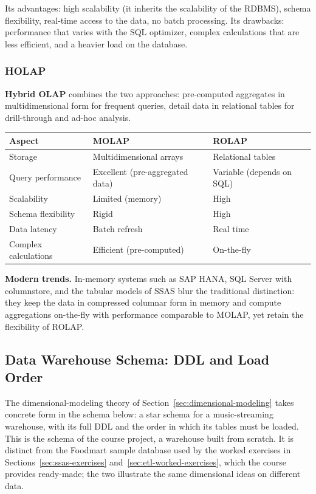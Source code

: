 Its advantages: high scalability (it inherits the scalability of the RDBMS), schema flexibility, real-time access to the data, no batch processing. Its drawbacks: performance that varies with the SQL optimizer, complex calculations that are less efficient, and a heavier load on the database.

\subsubsection{HOLAP}
\label{subsec:holap}

\textbf{Hybrid OLAP} combines the two approaches: pre-computed aggregates in multidimensional form for frequent queries, detail data in relational tables for drill-through and ad-hoc analysis.

{
\scriptsize
\begin{center}
\begin{tabular}{@{}lp{2.8cm}p{2.8cm}@{}}
\toprule
\textbf{Aspect} & \textbf{MOLAP} & \textbf{ROLAP} \\
\midrule
Storage & Multidimensional arrays & Relational tables \\
Query performance & Excellent (pre-aggregated data) & Variable (depends on SQL) \\
Scalability & Limited (memory) & High \\
Schema flexibility & Rigid & High \\
Data latency & Batch refresh & Real time \\
Complex calculations & Efficient (pre-computed) & On-the-fly \\
\bottomrule
\end{tabular}
\end{center}
}

\begin{notebox}
\textbf{Modern trends.}
In-memory systems such as SAP HANA, SQL Server with columnstore, and the tabular models of SSAS blur the traditional distinction: they keep the data in compressed columnar form in memory and compute aggregations on-the-fly with performance comparable to MOLAP, yet retain the flexibility of ROLAP.
\end{notebox}

\subsection{Data Warehouse Schema: DDL and Load Order}
\label{sec:dw-schema}

The dimensional-modeling theory of Section~\ref{sec:dimensional-modeling} takes concrete form in the schema below: a star schema for a music-streaming warehouse, with its full DDL and the order in which its tables must be loaded. This is the schema of the course project, a warehouse built from scratch. It is distinct from the Foodmart sample database used by the worked exercises in Sections~\ref{sec:ssas-exercises} and~\ref{sec:etl-worked-exercises}, which the course provides ready-made; the two illustrate the same dimensional ideas on different data.

